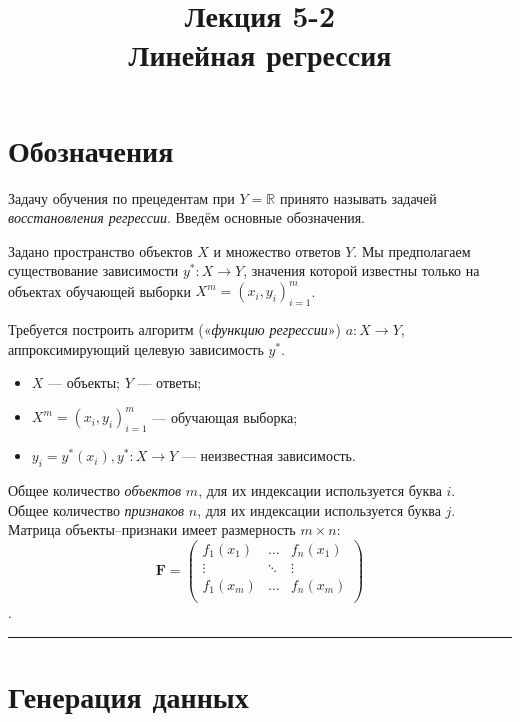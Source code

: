 \documentclass[11pt,a4paper]{article}
\title{Лекция 5-2 \\
    Линейная регрессия
    }
\renewcommand{\linethickness}{0.1ex}
\providecommand{\tightlist}{%
      \setlength{\itemsep}{0pt}\setlength{\parskip}{0pt}}
\begin{document}
    
    \maketitle

    \hypertarget{ux43eux431ux43eux437ux43dux430ux447ux435ux43dux438ux44f}{%
\section{Обозначения}\label{ux43eux431ux43eux437ux43dux430ux447ux435ux43dux438ux44f}}

Задачу обучения по прецедентам при \(Y = \mathbb{R}\) принято называть
задачей \emph{восстановления регрессии}. Введём основные обозначения.

Задано пространство объектов \(X\) и множество ответов \(Y\). Мы
предполагаем существование зависимости \(y^*:X \rightarrow Y\), значения
которой известны только на объектах обучающей выборки
\(X^m = (x_i, y_i)_{i=1}^m\).

Требуется построить алгоритм («\emph{функцию регрессии}»)
\(a: X \rightarrow Y\), аппроксимирующий целевую зависимость \(y^*\).

\begin{itemize}
\tightlist
\item
  \(X\) --- объекты; \(Y\) --- ответы;
\item
  \(X^m = (x_i, y_i)_{i=1}^m\) --- обучающая выборка;
\item
  \(y_i = y^*(x_i), y^*:X \rightarrow Y\) --- неизвестная зависимость.
\end{itemize}

Общее количество \emph{объектов} \(m\), для их индексации используется
буква \(i\).\\
Общее количество \emph{признаков} \(n\), для их индексации используется
буква \(j\).\\
Матрица объекты--признаки имеет размерность \(m \times n\): \[
  \mathbf{F} = 
  \begin{pmatrix}
    f_1(x_1) & \ldots & f_n(x_1) \\
    \vdots   & \ddots & \vdots   \\
    f_1(x_m) & \ldots & f_n(x_m) \\
  \end{pmatrix}
\].

    \begin{center}\rule{0.5\linewidth}{\linethickness}\end{center}

    \hypertarget{ux433ux435ux43dux435ux440ux430ux446ux438ux44f-ux434ux430ux43dux43dux44bux445}{%
\section{Генерация
данных}\label{ux433ux435ux43dux435ux440ux430ux446ux438ux44f-ux434ux430ux43dux43dux44bux445}}
\end{document}
